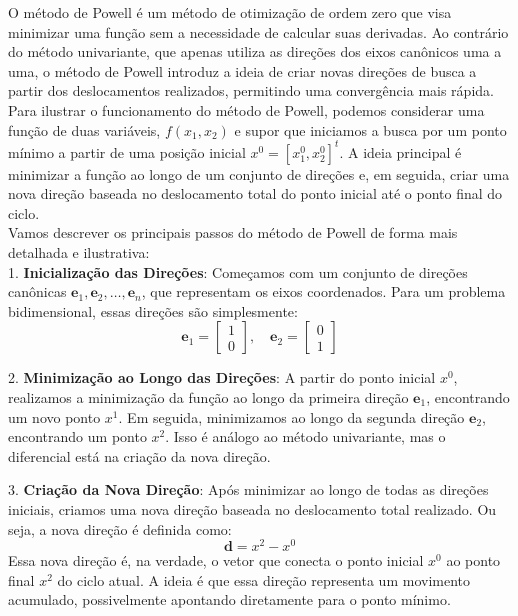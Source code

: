 \documentclass[a4paper, 12pt]{article}
\begin{document}
O método de Powell é um método de otimização de ordem zero que visa minimizar uma função sem a necessidade de calcular suas derivadas. Ao contrário do método univariante, que apenas utiliza as direções dos eixos canônicos uma a uma, o método de Powell introduz a ideia de criar novas direções de busca a partir dos deslocamentos realizados, permitindo uma convergência mais rápida.\\

Para ilustrar o funcionamento do método de Powell, podemos considerar uma função de duas variáveis, \(f(x_1, x_2)\) e supor que iniciamos a busca por um ponto mínimo a partir de uma posição inicial \(x^0 = [x_1^0, x_2^0]^t\). A ideia principal é minimizar a função ao longo de um conjunto de direções e, em seguida, criar uma nova direção baseada no deslocamento total do ponto inicial até o ponto final do ciclo.\\

Vamos descrever os principais passos do método de Powell de forma mais detalhada e ilustrativa:\\

1. \textbf{Inicialização das Direções}: Começamos com um conjunto de direções canônicas \(\mathbf{e}_1, \mathbf{e}_2, \dots, \mathbf{e}_n\), que representam os eixos coordenados. Para um problema bidimensional, essas direções são simplesmente:
    \[
    \mathbf{e}_1 = \begin{bmatrix} 1 \\ 0 \end{bmatrix}, \quad \mathbf{e}_2 = \begin{bmatrix} 0 \\ 1 \end{bmatrix}
    \]

2. \textbf{Minimização ao Longo das Direções}: A partir do ponto inicial \(x^0\), realizamos a minimização da função ao longo da primeira direção \(\mathbf{e}_1\), encontrando um novo ponto \(x^1\). Em seguida, minimizamos ao longo da segunda direção \(\mathbf{e}_2\), encontrando um ponto \(x^2\). Isso é análogo ao método univariante, mas o diferencial está na criação da nova direção.

3. \textbf{Criação da Nova Direção}: Após minimizar ao longo de todas as direções iniciais, criamos uma nova direção baseada no deslocamento total realizado. Ou seja, a nova direção é definida como:
    \[
    \mathbf{d} = x^2 - x^0
    \]
    Essa nova direção é, na verdade, o vetor que conecta o ponto inicial \(x^0\) ao ponto final \(x^2\) do ciclo atual. A ideia é que essa direção representa um movimento acumulado, possivelmente apontando diretamente para o ponto mínimo.
\end{document}
